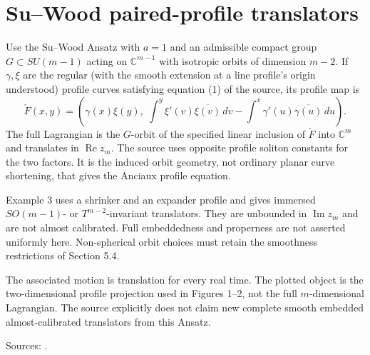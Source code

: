 \chapter{Su--Wood paired-profile translators}\label{sec:catalogue-su-wood-paired-translators}
\begin{example}\label{ex:catalogue-su-wood-paired-translators}
Use the Su--Wood Ansatz with $a=1$ and an admissible compact group $G\subset SU(m-1)$ acting on $\mathbb C^{m-1}$ with isotropic orbits of dimension $m-2$. If $\gamma,\xi$ are the regular (with the smooth extension at a line profile's origin understood) profile curves satisfying equation (1) of the source, its profile map is
\[
 \check F(x,y)=\left(\gamma(x)\xi(y),\;
 \int^y \xi'(v)\overline{\xi(v)}\,dv-
 \int^x\gamma'(u)\overline{\gamma(u)}\,du\right).
\]
The full Lagrangian is the $G$-orbit of the specified linear inclusion of $\check F$ into $\mathbb C^m$ and translates in $\operatorname{Re}z_m$. The source uses opposite profile soliton constants for the two factors. It is the induced orbit geometry, not ordinary planar curve shortening, that gives the Anciaux profile equation.

Example 3 uses a shrinker and an expander profile and gives immersed $SO(m-1)$- or $T^{m-2}$-invariant translators. They are unbounded in $\operatorname{Im}z_m$ and are not almost calibrated. Full embeddedness and properness are not asserted uniformly here. Non-spherical orbit choices must retain the smoothness restrictions of Section 5.4.

The associated motion is translation for every real time. The plotted object is the two-dimensional profile projection used in Figures 1–2, not the full $m$-dimensional Lagrangian. The source explicitly does not claim new complete smooth embedded almost-calibrated translators from this Ansatz.
\par Sources: \cite{CatSuWood2026}.
\end{example}

